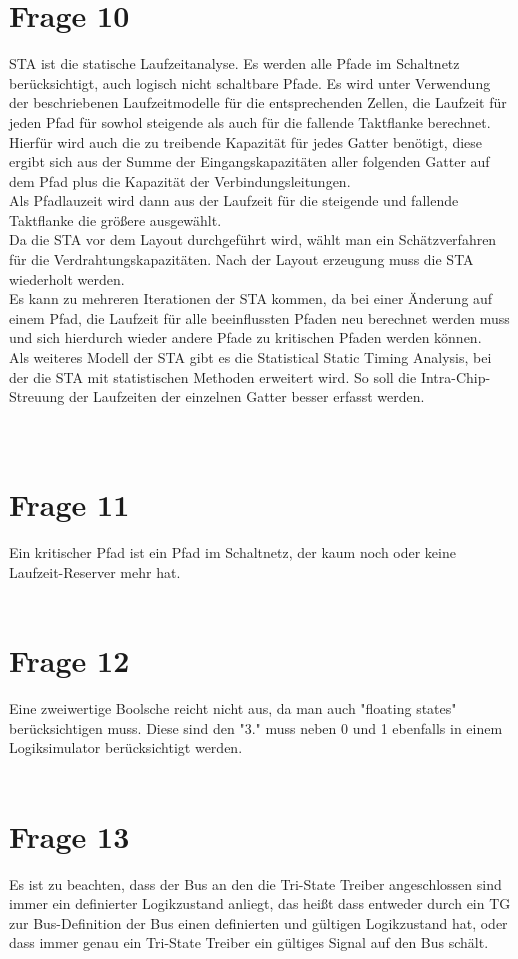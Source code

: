 \documentclass[a4paper]{scrartcl}
\begin{document}
\section*{Frage 10}
STA ist die statische Laufzeitanalyse. Es werden alle Pfade im Schaltnetz berücksichtigt, auch logisch nicht schaltbare Pfade. Es wird unter Verwendung der beschriebenen Laufzeitmodelle für die entsprechenden Zellen, die Laufzeit für jeden Pfad für sowhol steigende als auch für die fallende Taktflanke berechnet. Hierfür wird auch die zu treibende Kapazität für jedes Gatter benötigt, diese ergibt sich aus der Summe der Eingangskapazitäten aller folgenden Gatter auf dem Pfad plus die Kapazität der Verbindungsleitungen.\\
Als Pfadlauzeit wird dann aus der Laufzeit für die steigende und fallende Taktflanke die größere ausgewählt.\\
Da die STA vor dem Layout durchgeführt wird, wählt man ein Schätzverfahren für die Verdrahtungskapazitäten. Nach der Layout erzeugung muss die STA wiederholt werden.\\
Es kann zu mehreren Iterationen der STA kommen, da bei einer Änderung auf einem Pfad, die Laufzeit für alle beeinflussten Pfaden neu berechnet werden muss und sich hierdurch wieder andere Pfade zu kritischen Pfaden werden können.\\
Als weiteres Modell der STA gibt es die Statistical Static Timing Analysis, bei der die STA mit statistischen Methoden erweitert wird. So soll die Intra-Chip-Streuung der Laufzeiten der einzelnen Gatter besser erfasst werden.\\
~\\
~\\
\section*{Frage 11}
Ein kritischer Pfad ist ein Pfad im Schaltnetz, der kaum noch oder keine Laufzeit-Reserver mehr hat.
~\\
~\\
\section*{Frage 12}
Eine zweiwertige Boolsche reicht nicht aus, da man auch "floating states" berücksichtigen muss. Diese sind den "3." muss neben 0 und 1 ebenfalls in einem Logiksimulator berücksichtigt werden.
~\\
~\\
\section*{Frage 13}
Es ist zu beachten, dass der Bus an den die Tri-State Treiber angeschlossen sind immer ein definierter Logikzustand anliegt, das heißt dass entweder durch ein TG zur Bus-Definition der Bus einen definierten und gültigen Logikzustand hat, oder dass immer genau ein Tri-State Treiber ein gültiges Signal auf den Bus schält.
~\\
~\\
\end{document}
